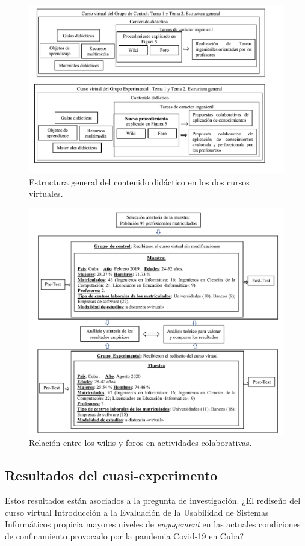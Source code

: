 \documentclass{textolivre}
\begin{document}
\begin{figure}[htbp]
 \centering
 \includegraphics[width=1\textwidth]{fig4.png}
 \caption{Estructura general del contenido didáctico en los dos cursos virtuales.}
 \label{fig4}
\end{figure}

\begin{figure}[htbp]
 \centering
 \includegraphics[width=1\textwidth]{fig5.png}
 \caption{Relación entre los wikis y foros en actividades colaborativas.}
 \label{fig5}
\end{figure}

\subsection{Resultados del cuasi-experimento}
Estos resultados están asociados a la pregunta de investigación. ¿El rediseño del curso virtual Introducción a la Evaluación de la Usabilidad de Sistemas Informáticos propicia mayores niveles de \emph{engagement} en las actuales condiciones de confinamiento provocado por la pandemia Covid-19 en Cuba?
\end{document}
